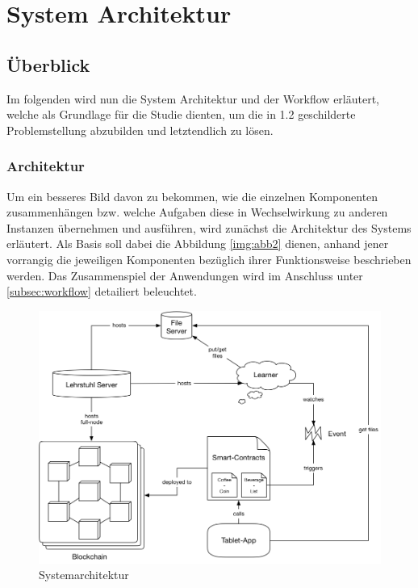 \chapter{System Architektur}
\label{kap:Kapitel03}

\section{Überblick}
Im folgenden wird nun die System Architektur und der Workflow erläutert, welche als Grundlage für die Studie dienten, um die in 1.2 geschilderte Problemstellung abzubilden und letztendlich zu lösen. 

\subsection{Architektur}
\label{subsec:architecture}
Um ein besseres Bild davon zu bekommen, wie die einzelnen Komponenten 
zusammenhängen bzw. welche Aufgaben diese in Wechselwirkung zu anderen Instanzen übernehmen und ausführen, wird zunächst die Architektur des Systems erläutert. Als Basis soll dabei die Abbildung \ref{img:abb2} dienen, anhand jener vorrangig die jeweiligen Komponenten bezüglich ihrer Funktionsweise beschrieben werden. Das Zusammenspiel der Anwendungen wird im Anschluss unter \ref{subsec:workflow} detailiert beleuchtet.

\clearpage
\newpage

\begin{figure}[th!]
	\centering
	\includegraphics[width=.99\columnwidth]{./Abbildungen/Kapitel_03/system_architecture.png}
	\caption{Systemarchitektur}
	\label{img:abb1}
\end{figure}
\FloatBarrier

